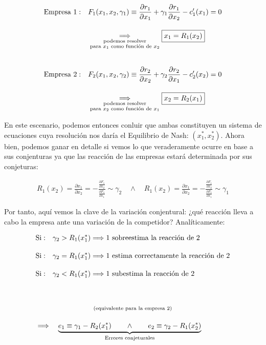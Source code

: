 \documentclass[10pt,a4paper]{article}
\begin{document}
$$\begin{aligned}
    &\text{Empresa 1}:&&F_1(x_1,x_2,\gamma_1)\equiv \frac{\partial r_1}{\partial x_1}+\gamma_1\frac{\partial r_1}{\partial x_2}-c_1'(x_1)=0\\[1em]
    &&&\underset{\substack{\text{\scriptsize podemos resolver}\\\text{\scriptsize para $x_1$ como función de $x_2$}}}{\Longrightarrow}\boxed{x_1=R_1(x_2)}\\[2em]
    &\text{Empresa 2}:&&F_2(x_1,x_2,\gamma_2)\equiv \frac{\partial r_2}{\partial x_2}+\gamma_2\frac{\partial r_2}{\partial x_1}-c_2'(x_2)=0\\[1em]
    &&&\underset{\substack{\text{\scriptsize podemos resolver}\\\text{\scriptsize para $x_2$ como función de $x_1$}}}{\Longrightarrow}\boxed{x_2=R_2(x_1)}
\end{aligned}$$

En este escenario, podemos entonces conluir que ambas constituyen un sistema de ecuaciones cuya resolución nos daría el Equilibrio de Nash: $(x_1^*,x_2^*)$. Ahora bien, podemos ganar en detalle si vemos lo que veraderamente ocurre en base a sus conjenturas ya que las reacción de las empresas estará determinada por sus conjeturas:

$$\begin{aligned}
    R_1(x_2)=\frac{\partial x_1}{\partial x_2}=-\frac{\frac{\partial F_1}{\partial x_2}}{\frac{\partial F_1}{\partial x_1}}\sim\gamma_2\quad\wedge\quad R_1(x_2)=\frac{\partial x_1}{\partial x_2}=-\frac{\frac{\partial F_1}{\partial x_2}}{\frac{\partial F_1}{\partial x_1}}\sim\gamma_1
\end{aligned}$$

Por tanto, aquí vemos la clave de la variación conjentural: ¿qué reacción lleva a cabo la empresa ante una variación de la competidor? Analíticamente:

$$\begin{aligned}
    &\underset{\substack{\\[1em]\\\text{\scriptsize (equivalente para la empresa 2)}}}{\begin{aligned}
        &\text{Si}:&& \gamma_2>R_1(x_1^*)\Longrightarrow\text{1 sobreestima la reacción de 2}\\[1em]
        &\text{Si}:&& \gamma_2=R_1(x_1^*)\Longrightarrow\text{1 estima correctamente la reacción de 2}\\[1em]
        &\text{Si}:&& \gamma_2<R_1(x_1^*)\Longrightarrow\text{1 subestima la reacción de 2}\\[2em]
    \end{aligned}}\\[1em]
    &\Longrightarrow\quad \underbrace{e_1\equiv \gamma_1-R_2(x_1^*)\qquad \wedge\qquad e_2\equiv\gamma_2-R_1(x_2^*)}_{\text{\scriptsize Errores conjeturales}}
\end{aligned}$$
\end{document}
